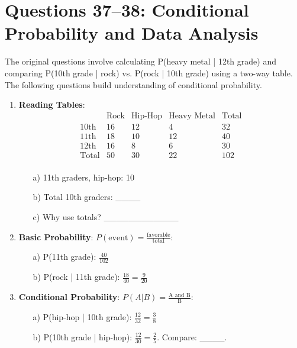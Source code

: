 \documentclass[12pt]{article}
\begin{document}
\section*{Questions 37--38: Conditional Probability and Data Analysis}
The original questions involve calculating P(heavy metal | 12th grade) and comparing P(10th grade | rock) vs. P(rock | 10th grade) using a two-way table. The following questions build understanding of conditional probability.

\begin{enumerate}[label=37.\arabic*]
    \item \textbf{Reading Tables}: 
    \[
    \begin{array}{c|ccc|c}
    & \text{Rock} & \text{Hip-Hop} & \text{Heavy Metal} & \text{Total} \\
    \hline
    10\text{th} & 16 & 12 & 4 & 32 \\
    11\text{th} & 18 & 10 & 12 & 40 \\
    12\text{th} & 16 & 8 & 6 & 30 \\
    \hline
    \text{Total} & 50 & 30 & 22 & 102 \\
    \end{array}
    \]
    \begin{enumerate}
        \item[a)] 11th graders, hip-hop: 10
        \item[b)] Total 10th graders: \_\_\_\_
        \item[c)] Why use totals? \_\_\_\_\_\_\_\_\_\_\_\_
    \end{enumerate}
    \item \textbf{Basic Probability}: \( P(\text{event}) = \frac{\text{favorable}}{\text{total}} \):
    \begin{enumerate}
        \item[a)] P(11th grade): \( \frac{40}{102} \)
        \item[b)] P(rock | 11th grade): \( \frac{18}{40} = \frac{9}{20} \)
    \end{enumerate}
    \item \textbf{Conditional Probability}: \( P(A|B) = \frac{\text{A and B}}{\text{B}} \):
    \begin{enumerate}
        \item[a)] P(hip-hop | 10th grade): \( \frac{12}{32} = \frac{3}{8} \)
        \item[b)] P(10th grade | hip-hop): \( \frac{12}{30} = \frac{2}{5} \). Compare: \_\_\_\_.
    \end{enumerate}

\end{enumerate}
\end{document}
